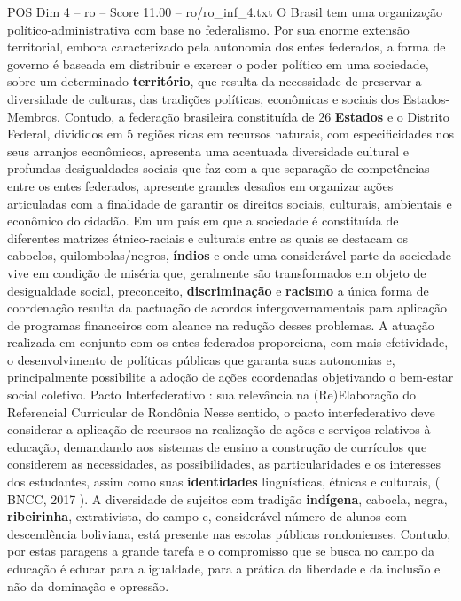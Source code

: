 \begin{textsample}{POS Dim 4 – ro – Score 11.00 – ro/ro\_inf\_4.txt}  \label{ex:f4_pos_216}
O Brasil tem uma organização político-administrativa com base no federalismo.
Por sua enorme extensão territorial, embora caracterizado pela autonomia dos entes federados, a forma de governo é baseada em distribuir e exercer o poder político em uma sociedade, sobre um determinado \textbf{território}, que resulta da necessidade de preservar a diversidade de culturas, das tradições políticas, econômicas e sociais dos Estados-Membros.
Contudo, a federação brasileira constituída de 26 \textbf{Estados} e o Distrito Federal, divididos em 5 regiões ricas em recursos naturais, com especificidades nos seus arranjos econômicos, apresenta uma acentuada diversidade cultural e profundas desigualdades sociais que faz com a que separação de competências entre os entes federados, apresente grandes desafios em organizar ações articuladas com a finalidade de garantir os direitos sociais, culturais, ambientais e econômico do cidadão.
Em um país em que a sociedade é constituída de diferentes matrizes étnico-raciais e culturais entre as quais se destacam os caboclos, quilombolas/negros, \textbf{índios} e onde uma considerável parte da sociedade vive em condição de miséria que, geralmente são transformados em objeto de desigualdade social, preconceito, \textbf{discriminação} e \textbf{racismo} a única forma de coordenação resulta da pactuação de acordos intergovernamentais para aplicação de programas financeiros com alcance na redução desses problemas.
A atuação realizada em conjunto com os entes federados proporciona, com mais efetividade, o desenvolvimento de políticas públicas que garanta suas autonomias e, principalmente possibilite a adoção de ações coordenadas objetivando o bem-estar social coletivo.
Pacto Interfederativo : sua relevância na (Re)Elaboração do Referencial Curricular de Rondônia Nesse sentido, o pacto interfederativo deve considerar a aplicação de recursos na realização de ações e serviços relativos à educação, demandando aos sistemas de ensino a construção de currículos que considerem as necessidades, as possibilidades, as particularidades e os interesses dos estudantes, assim como suas \textbf{identidades} linguísticas, étnicas e culturais, ( BNCC, 2017 ).
A diversidade de sujeitos com tradição \textbf{indígena}, cabocla, negra, \textbf{ribeirinha}, extrativista, do campo e, considerável número de alunos com descendência boliviana, está presente nas escolas públicas rondonienses.
Contudo, por estas paragens a grande tarefa e o compromisso que se busca no campo da educação é educar para a igualdade, para a prática da liberdade e da inclusão e não da dominação e opressão.

\end{textsample}
